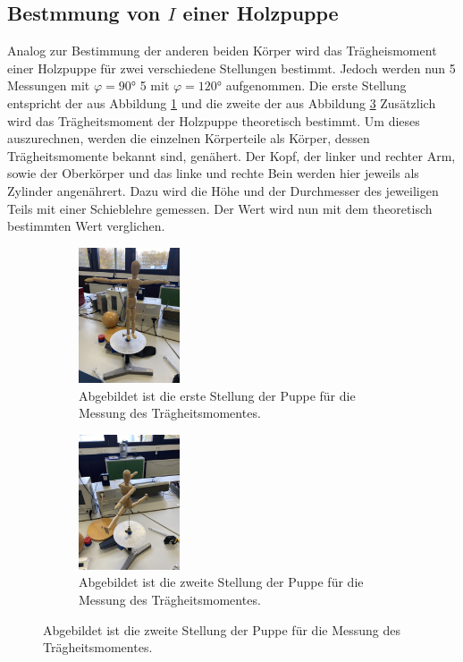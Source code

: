     \subsection{Bestmmung von $I$ einer Holzpuppe}
    Analog zur Bestimmung der anderen beiden Körper wird das Trägheismoment einer Holzpuppe für zwei verschiedene Stellungen bestimmt.
    Jedoch werden nun 5 Messungen mit $\varphi= 90$\unit{\degree} 5  mit $\varphi= 120$\unit{\degree} aufgenommen.
    Die erste Stellung entspricht der aus Abbildung \ref{fig:Stellung1} und die zweite der aus Abbildung \ref{fig:Stellung2} %
    Zusätzlich wird das Trägheitsmoment der Holzpuppe theoretisch bestimmt.
    Um dieses auszurechnen, werden die einzelnen Körperteile als Körper, dessen Trägheitsmomente bekannt sind, genähert.
    Der Kopf, der linker und rechter Arm, sowie der Oberkörper und das linke und rechte Bein werden hier jeweils als Zylinder angenährert.
    Dazu wird die Höhe und der Durchmesser des jeweiligen Teils mit einer Schieblehre gemessen.
    Der Wert wird nun mit dem theoretisch bestimmten Wert verglichen.\\

    \begin{figure}[H]
      \begin{subfigure}[H]{0.5 \textwidth}
        \includegraphics[height=4cm, angle=270]{Bilder/Stellung1.jpg}
        \caption{Abgebildet ist die erste Stellung der Puppe für die Messung des Trägheitsmomentes.}
       \label{fig:Stellung1}
      \end{subfigure}
      \begin{subfigure}[H]{0.5 \textwidth}
        \includegraphics[height=4cm, angle=270]{Bilder/Stellung2.jpg}
        \caption{Abgebildet ist die zweite Stellung der Puppe für die Messung des Trägheitsmomentes.}
        \label{fig:Stellung2}
      \end{subfigure}
    \end{figure}



